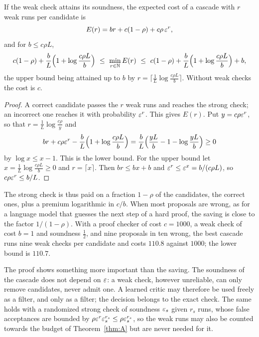 \begin{theorem}\label{thm:cascade}
If the weak check attains its soundness, the expected cost of a cascade with $r$ weak runs per candidate is
\[
E(r)=br+c(1-\rho)+c\rho\,\varepsilon^{r},
\]
and for $b\le c\rho L$,
\begin{equation}\label{eq:cascade}
c(1-\rho)+\frac bL\Bigl(1+\log\frac{c\rho L}{b}\Bigr)\ \le\ \min_{r\in\NN}E(r)\ \le\ c(1-\rho)+\frac bL\Bigl(1+\log\frac{c\rho L}{b}\Bigr)+b,
\end{equation}
the upper bound being attained up to $b$ by $r=\lceil\frac1L\log\frac{c\rho L}{b}\rceil$. Without weak checks the cost is $c$.
\end{theorem}

\begin{proof}
A correct candidate passes the $r$ weak runs and reaches the strong check; an incorrect one reaches it with probability $\varepsilon^{r}$. This gives $E(r)$. Put $y=c\rho\varepsilon^{r}$, so that $r=\frac1L\log\frac{c\rho}{y}$ and
\[
br+c\rho\varepsilon^{r}-\frac bL\Bigl(1+\log\frac{c\rho L}{b}\Bigr)=\frac bL\Bigl(\frac{yL}{b}-1-\log\frac{yL}{b}\Bigr)\ge0
\]
by $\log x\le x-1$. This is the lower bound. For the upper bound let $x=\frac1L\log\frac{c\rho L}{b}\ge0$ and $r=\lceil x\rceil$. Then $br\le bx+b$ and $\varepsilon^{r}\le\varepsilon^{x}=b/(c\rho L)$, so $c\rho\varepsilon^{r}\le b/L$.
\end{proof}

The strong check is thus paid on a fraction $1-\rho$ of the candidates, the correct ones, plus a premium logarithmic in $c/b$. When most proposals are wrong, as for a language model that guesses the next step of a hard proof, the saving is close to the factor $1/(1-\rho)$. With a proof checker of cost $c=1000$, a weak check of cost $b=1$ and soundness $\frac12$, and nine proposals in ten wrong, the best cascade runs nine weak checks per candidate and costs $110.8$ against $1000$; the lower bound is $110.7$.

The proof shows something more important than the saving. The soundness of the cascade does not depend on $\varepsilon$: a weak check, however unreliable, can only remove candidates, never admit one. A learned critic may therefore be used freely as a filter, and only as a filter; the decision belongs to the exact check. The same holds with a randomized strong check of soundness $\varepsilon_{s}$ given $r_{s}$ runs, whose false acceptances are bounded by $\rho\varepsilon^{r}\varepsilon_{s}^{r_{s}}\le\rho\varepsilon_{s}^{r_{s}}$, so the weak runs may also be counted towards the budget of Theorem~\ref{thm:A} but are never needed for it.

